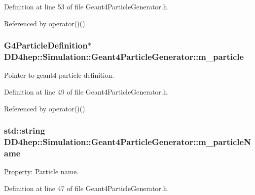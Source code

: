Definition at line 53 of file Geant4ParticleGenerator.h.

Referenced by operator()().\hypertarget{class_d_d4hep_1_1_simulation_1_1_geant4_particle_generator_a9f974a1df5025bb1ff4f65d6ed73bbd1}{
\subsubsection[{m\_\-particle}]{\setlength{\rightskip}{0pt plus 5cm}G4ParticleDefinition$\ast$ {\bf DD4hep::Simulation::Geant4ParticleGenerator::m\_\-particle}}}
\label{class_d_d4hep_1_1_simulation_1_1_geant4_particle_generator_a9f974a1df5025bb1ff4f65d6ed73bbd1}


Pointer to geant4 particle definition. 

Definition at line 49 of file Geant4ParticleGenerator.h.

Referenced by operator()().\hypertarget{class_d_d4hep_1_1_simulation_1_1_geant4_particle_generator_ae7181a20c8374bee76cd7d29ea0e7dc7}{
\subsubsection[{m\_\-particleName}]{\setlength{\rightskip}{0pt plus 5cm}std::string {\bf DD4hep::Simulation::Geant4ParticleGenerator::m\_\-particleName}}}
\label{class_d_d4hep_1_1_simulation_1_1_geant4_particle_generator_ae7181a20c8374bee76cd7d29ea0e7dc7}


\hyperlink{class_d_d4hep_1_1_property}{Property}: Particle name. 

Definition at line 47 of file Geant4ParticleGenerator.h.

